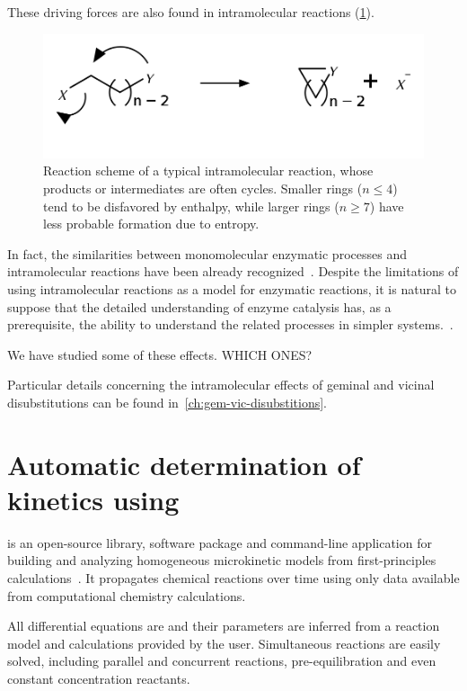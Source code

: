 These driving forces are also found in intramolecular reactions (\cref{fig:reacoes-intramoleculares}).
%
\begin{figure}[hbtp]
	\centering
	\includegraphics[width=.6\textwidth]{figures/reacao-intramolecular}
	\caption[Typical scheme of an intramolecular reactions]{
		Reaction scheme of a typical intramolecular reaction,
		whose products or
		intermediates are often cycles.
		Smaller rings ($n \le 4 $)
		tend to be disfavored by enthalpy,
		while larger rings ($n \ge 7 $)
		have less probable formation due to entropy.}%
	\label{fig:reacoes-intramoleculares}
\end{figure}
%
In fact,
the similarities between monomolecular enzymatic processes and
intramolecular reactions have been already recognized~\cite{Nilsson_1933,Bruice_1960b,Jung_1990}.
Despite the limitations of using intramolecular reactions as a model for
enzymatic reactions,
it is natural to suppose that the detailed understanding
of enzyme catalysis has,
as a prerequisite,
the ability to understand the
related processes in simpler systems.~\cite{Kirby_1972}.

We have studied some of these effects.
WHICH ONES?\@

Particular details concerning the intramolecular effects of geminal and
vicinal disubstitutions can be found in~\cref{ch:gem-vic-disubstitions}.

\section{Automatic determination of kinetics using \overreact}%
\label{sec:overreact-methods}

\overreact is an open-source library,
software package and command-line
application for building and analyzing
homogeneous microkinetic models from first-principles
calculations~\cite{Schneider_2022,overreact2021zenodo}.
It propagates chemical reactions over time using only data available from
computational chemistry calculations.

All differential equations are and their parameters are inferred from a
reaction model and calculations provided by the user.
Simultaneous reactions are easily solved,
including parallel and concurrent
reactions,
pre-equilibration and even constant concentration reactants.

